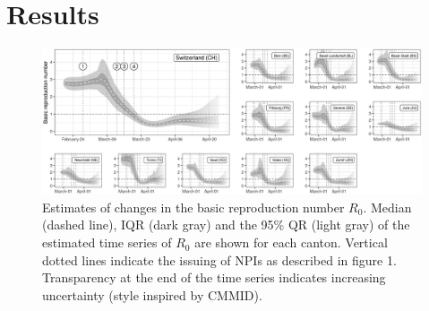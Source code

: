 \section{Results}
\begin{figure}\centering
  \includegraphics[width=\textwidth]{fig_covid-switzerland-npi/FIGURE_2.png}
  \caption[Estimates of changes in the basic reproduction number $R_0$.]{Estimates of changes in the basic reproduction number $R_0$. Median (dashed line), IQR (dark gray) and the 95\% QR (light gray) of the estimated time series of $R_0$ are shown for each canton. Vertical dotted lines indicate the issuing of NPIs as described in figure 1. Transparency at the end of the time series indicates increasing uncertainty (style inspired by CMMID).}
  \label{fig:covid-ch-r0}
\end{figure}

